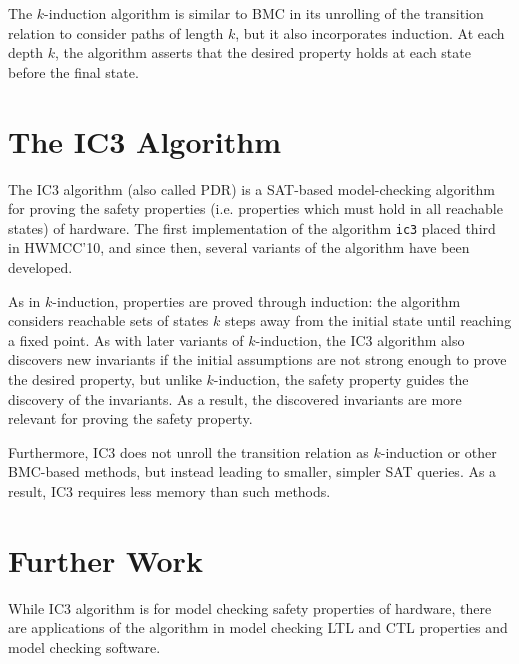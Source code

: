 \documentclass[12pt,a4paper,twoside,openright]{report}
\begin{document}
The $k$-induction algorithm is similar to BMC in its unrolling of the transition relation
to consider paths of length $k$, but it also incorporates induction. At each depth
$k$, the algorithm asserts that the desired property holds at each state before the
final state. %

\section{The IC3 Algorithm}


The IC3 algorithm (also called PDR) is a SAT-based model-checking algorithm
for proving the safety properties (i.e. properties which must hold in all reachable states)
of hardware. The first implementation of the algorithm \verb,ic3, placed third in HWMCC'10,
and since then, several variants of the algorithm have been developed.

As in $k$-induction, properties are proved through induction: the algorithm considers
reachable sets of states $k$ steps away from the initial state until reaching a fixed point.
As with later variants of $k$-induction, the IC3 algorithm also discovers new invariants
if the initial assumptions are not strong enough to prove the desired property, but unlike
$k$-induction, the safety property guides the discovery of the invariants. As a result,
the discovered invariants are more relevant for proving the safety property.

Furthermore, IC3 does not unroll the transition relation as $k$-induction or other
BMC-based methods, but instead leading to smaller, simpler SAT queries. As
a result, IC3 requires less memory than such methods.


\section{Further Work}




While IC3 algorithm is for model checking safety properties of hardware, there are
applications of the algorithm in model checking LTL and CTL properties and
model checking software.
\end{document}
